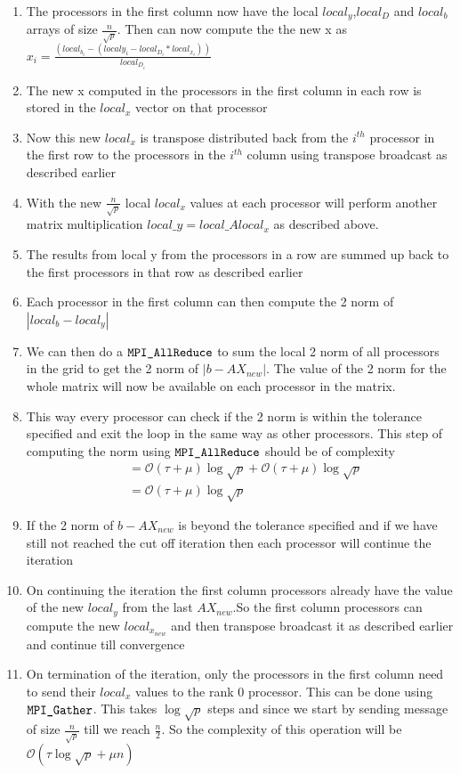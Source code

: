 \documentclass[twoside,11pt]{article}\usepackage{amsmath,amsfonts,amsthm,fullpage}
\begin{document}
\begin{enumerate}
\item
The processors in the first column now have the local $local_y$,$local_D$ and $local_b$ arrays of size $\frac{n}{\sqrt{p}}$. Then can now compute the the new x as $x_i = \frac{(local_{b_i} - (local{y_i} -local_{D_i}*local_{x_i}))}{local_{D_i}}$
\item
The new x computed in the processors in the first column in each row is stored in the $local_x$ vector on that processor
\item
Now this new $local_x$ is transpose distributed back from the $i^{th}$ processor in the first row to the processors in the $i^{th}$ column using transpose broadcast as described earlier
\item
With the new $\frac{n}{\sqrt{p}}$ local $local_x$ values at each processor will perform another matrix multiplication $local\_y= local\_A local_x$ as described above.
\item
The results from local y from the processors in a row are summed up back to the first processors in that row as described earlier
\item
Each processor in the first column can then compute the 2 norm of $|local_b-local_y|$
\item
We can then do a $\verb|MPI_AllReduce|$ to sum the local 2 norm of all processors in the grid to get the 2 norm of $|b-AX_{new}|$. The value of the 2 norm for the whole matrix will now be available on each processor in the matrix. 
\item
This way every processor can check if the 2 norm is within the tolerance specified and exit the loop in the same way as other processors. This step of computing the norm using  $\verb|MPI_AllReduce|$ should be of complexity 
\begin{align}
&= \mathcal{O}(\tau+\mu)\log \sqrt{p} + \mathcal{O}(\tau+\mu)\log \sqrt{p}\nonumber\\
&= \mathcal{O}(\tau+\mu)\log \sqrt{p} \label{l_2}
\end{align}
\item
If the 2 norm of $b-AX_{new}$ is beyond the tolerance specified and if we have still not reached the cut off iteration then each processor will continue the iteration
\item
On continuing the iteration the first column processors already have the value of the new $local_y$ from the last $AX_{new}$.So the first column processors can compute the new $local_{x_{new}}$ and then transpose broadcast it as described earlier and continue till convergence
\item
On termination of the iteration, only the processors in the first column need to send their $local_x$ values to the rank $0$ processor. This can be done using $\verb|MPI_Gather|$. This takes $\log \sqrt{p}$ steps and since we start by sending message of size $\frac{n}{\sqrt{p}}$ till we reach $\frac{n}{2}$. So the complexity of this operation will be $\mathcal{O}(\tau \log \sqrt{p} + \mu n)$
\end{enumerate}
\end{document}
